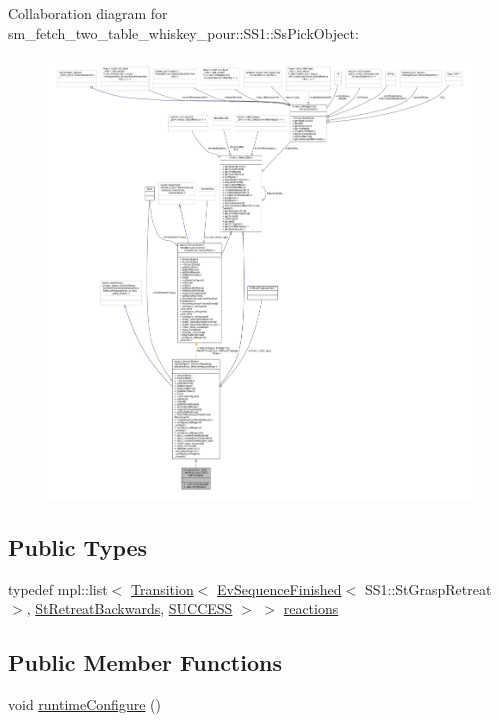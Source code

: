 Collaboration diagram for sm\+\_\+fetch\+\_\+two\+\_\+table\+\_\+whiskey\+\_\+pour\+:\+:S\+S1\+:\+:Ss\+Pick\+Object\+:
\nopagebreak
\begin{figure}[H]
\begin{center}
\leavevmode
\includegraphics[width=350pt]{structsm__fetch__two__table__whiskey__pour_1_1SS1_1_1SsPickObject__coll__graph}
\end{center}
\end{figure}
\subsection*{Public Types}
\begin{DoxyCompactItemize}
\item 
typedef mpl\+::list$<$ \hyperlink{classsmacc_1_1Transition}{Transition}$<$ \hyperlink{structsmacc_1_1default__events_1_1EvSequenceFinished}{Ev\+Sequence\+Finished}$<$ S\+S1\+::\+St\+Grasp\+Retreat $>$, \hyperlink{structsm__fetch__two__table__whiskey__pour_1_1StRetreatBackwards}{St\+Retreat\+Backwards}, \hyperlink{structsmacc_1_1default__transition__tags_1_1SUCCESS}{S\+U\+C\+C\+E\+SS} $>$ $>$ \hyperlink{structsm__fetch__two__table__whiskey__pour_1_1SS1_1_1SsPickObject_a8f9ac1d1e06c2e8c8d4c88d2cdaf99fa}{reactions}
\end{DoxyCompactItemize}
\subsection*{Public Member Functions}
\begin{DoxyCompactItemize}
\item 
void \hyperlink{structsm__fetch__two__table__whiskey__pour_1_1SS1_1_1SsPickObject_af841fee2d87b3af09af35fd67aa34d1b}{runtime\+Configure} ()
\end{DoxyCompactItemize}
